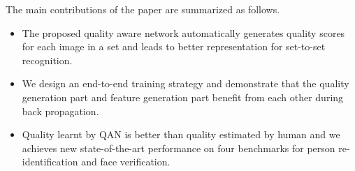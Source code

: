 The main contributions of the paper are summarized as follows.
\begin{itemize}
\item The proposed quality aware network automatically generates quality scores for each image in a set and leads to better representation for set-to-set recognition.

\item We design an end-to-end training strategy and demonstrate that the quality generation part and feature generation part benefit from each other during back propagation.


\item  Quality learnt by QAN is better than quality estimated by human and we achieves new state-of-the-art performance on four benchmarks for person re-identification and face verification.
\end{itemize}

